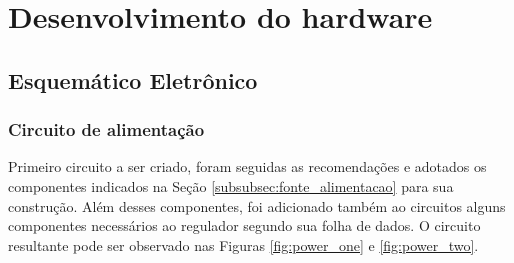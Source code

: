 




















\section{Desenvolvimento do hardware}

\subsection{Esquemático Eletrônico}

\subsubsection{Circuito de alimentação}

Primeiro circuito a ser criado, foram seguidas as recomendações e adotados os componentes indicados na Seção \ref{subsubsec:fonte_alimentacao} para sua construção. Além desses componentes, foi adicionado também ao circuitos alguns componentes necessários ao regulador segundo sua folha de dados. O circuito resultante pode ser observado nas Figuras \ref{fig:power_one} e \ref{fig:power_two}. 


